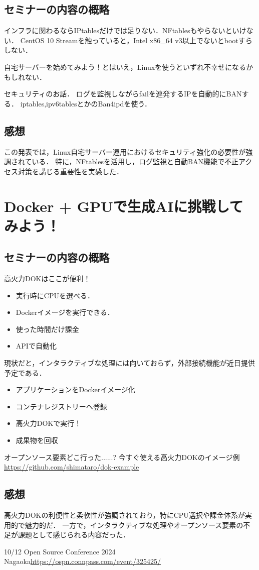 \documentclass[titlepage,a4paper]{jsarticle}
\begin{document}
\subsection{セミナーの内容の概略}
インフラに関わるならIPtablesだけでは足りない．NFtablesもやらないといけない．
CentOS 10 Streamを触っていると，Intel x86\_64 v3以上でないとbootすらしない．

自宅サーバーを始めてみよう！とはいえ，Linuxを使うといずれ不幸せになるかもしれない．

セキュリティのお話．
ログを監視しながらfailを連発するIPを自動的にBANする．
iptables,ipv6tablesとかのBan4ipdを使う．
\subsection{感想}
この発表では，Linux自宅サーバー運用におけるセキュリティ強化の必要性が強調されている．
特に，NFtablesを活用し，ログ監視と自動BAN機能で不正アクセス対策を講じる重要性を実感した．
\section{Docker + GPUで生成AIに挑戦してみよう！} %
\subsection{セミナーの内容の概略}
高火力DOKはここが便利！
\begin{itemize}
  \item 実行時にCPUを選べる．
  \item Dockerイメージを実行できる．
  \item 使った時間だけ課金
  \item APIで自動化
\end{itemize}
現状だと，インタラクティブな処理には向いておらず，外部接続機能が近日提供予定である．

\begin{itemize}
  \item アプリケーションをDockerイメージ化
  \item コンテナレジストリーへ登録
  \item 高火力DOKで実行！
  \item 成果物を回収
\end{itemize}
オープンソース要素どこ行った......?
今すぐ使える高火力DOKのイメージ例\url{https://github.com/shimataro/dok-example}
\subsection{感想}
高火力DOKの利便性と柔軟性が強調されており，特にCPU選択や課金体系が実用的で魅力的だ．
一方で，インタラクティブな処理やオープンソース要素の不足が課題として感じられる内容だった．
\begin{thebibliography}{99}
  \bibitem{} 10/12 Open Source Conference 2024 Nagaoka\url{https://ospn.connpass.com/event/325425/}
\end{thebibliography}
\end{document}
